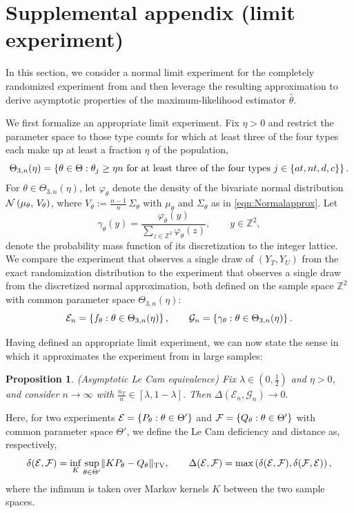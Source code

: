 \documentclass[12pt,reqno]{amsart}
\theoremstyle{theorem}
\newtheorem{prop}{Proposition}[section]
\theoremstyle{definition}
\newcommand{\0}{\mathbf{0}}
\newcommand{\1}{\mathbf{1}}
\begin{document}
\newpage

\section{Supplemental appendix (limit experiment)}

In this section, we consider a normal limit experiment for the completely randomized experiment from  and then leverage the resulting approximation to derive asymptotic properties of the maximum-likelihood estimator $\hat{\theta}$.

We first formalize an appropriate limit experiment. 
Fix $\eta > 0$ and restrict the parameter space to those type counts for which at least three of the four types each make up at least a fraction $\eta$ of the population,
\[
    \Theta_{3,n}(\eta) = \left\{{\theta \in \Theta : \theta_j \geq \eta n \text{ for at least three of the four types } j \in \left\{{at, nt, d, c}\right\}}\right\}.
\]
For $\theta \in \Theta_{3,n}(\eta)$, let $\varphi_\theta$ denote the density of the bivariate normal distribution $\mathcal{N}\left(\mu_\theta,\, V_\theta\right)$, where $V_\theta := \tfrac{n-1}{n} \, \Sigma_\theta$ with $\mu_\theta$ and $\Sigma_\theta$ as in \eqref{eqn:Normalapprox}. Let
\[
    \gamma_\theta(y) = \frac{\varphi_\theta(y)}{\sum_{z \in \mathbb{Z}^2} \varphi_\theta(z)}, \qquad y \in \mathbb{Z}^2,
\]
denote the probability mass function of its discretization to the integer lattice. We compare the experiment that observes a single draw of $(Y_T, Y_U)$ from the exact randomization distribution to the experiment that observes a single draw from the discretized normal approximation, both defined on the sample space $\mathbb{Z}^2$ with common parameter space $\Theta_{3,n}(\eta)$:
\[
    \mathcal{E}_n = \left\{{f_\theta : \theta \in \Theta_{3,n}(\eta)}\right\},
    \qquad
    \mathcal{G}_n = \left\{{\gamma_\theta : \theta \in \Theta_{3,n}(\eta)}\right\}.
\]

Having defined an appropriate limit experiment, we can now state the sense in which it approximates the experiment from  in large samples:

\begin{prop}
\label{prop:lecam}
\emph{(Asymptotic Le Cam equivalence)}
Fix $\lambda \in (0, \tfrac{1}{2})$ and $\eta > 0$, and consider $n \rightarrow \infty$ with $\tfrac{n_T}{n} \in [\lambda, 1 - \lambda]$. Then
\(
    \Delta(\mathcal{E}_n, \mathcal{G}_n) \rightarrow 0.
\)
\end{prop}

Here, for two experiments $\mathcal{E} = \left\{{P_\theta : \theta \in \Theta'}\right\}$ and $\mathcal{F} = \left\{{Q_\theta : \theta \in \Theta'}\right\}$ with common parameter space $\Theta'$, we define the Le Cam deficiency and distance as, respectively,
\[
    \delta(\mathcal{E}, \mathcal{F}) = \inf_K \sup_{\theta \in \Theta'} \lVert K P_\theta - Q_\theta\rVert_{\mathrm{TV}},
    \qquad
    \Delta(\mathcal{E}, \mathcal{F}) = \max\left(\delta(\mathcal{E}, \mathcal{F}), \delta(\mathcal{F}, \mathcal{E})\right),
\]
where the infimum is taken over Markov kernels $K$ between the two sample spaces.
\end{document}
